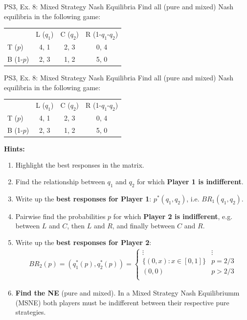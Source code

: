 \begin{frame}{PS3, Ex. 8: Mixed Strategy Nash Equilibria}
  Find all (pure and mixed) Nash equilibria in the following game:
    \begin{table}
      \begin{tabular}{l|c|c|c|}
          \multicolumn{1}{c}{}  & \multicolumn{1}{c}{L ($q_1$)} & \multicolumn{1}{c}{C ($q_2$)} & \multicolumn{1}{c}{R (1-$q_1$-$q_2$)} \\\cline{2-4}
          T ($p$)   & 4, 1 & 2, 3 & 0, 4 \\\cline{2-4}
          B (1-$p$) & 2, 3 & 1, 2 & 5, 0 \\\cline{2-4}
      \end{tabular}
    \end{table}
  \vfill\null
\end{frame}
\begin{frame}{PS3, Ex. 8: Mixed Strategy Nash Equilibria}
  Find all (pure and mixed) Nash equilibria in the following game:
    \begin{table}
      \begin{tabular}{l|c|c|c|}
          \multicolumn{1}{c}{}  & \multicolumn{1}{c}{L ($q_1$)} & \multicolumn{1}{c}{C ($q_2$)} & \multicolumn{1}{c}{R (1-$q_1$-$q_2$)} \\\cline{2-4}
          T ($p$)   & 4, 1 & 2, 3 & 0, 4 \\\cline{2-4}
          B (1-$p$) & 2, 3 & 1, 2 & 5, 0 \\\cline{2-4}
      \end{tabular}
    \end{table}
    \textbf{Hints:}
    \begin{enumerate}
      \item Highlight the best responses in the matrix.
      \item Find the relationship between $q_1$ and $q_2$ for which \textbf{Player 1 is indifferent}.
      \item Write up the \textbf{best responses for Player 1}: $p^{*}(q_1,q_2)$, i.e. $BR_1(q_1,q_2)$.
      \item Pairwise find the probabilities $p$ for which \textbf{Player 2 is indifferent}, e.g. between $L$ and $C$, then $L$ and $R$, and finally between $C$ and $R$.
      \item Write up the \textbf{best responses for Player 2}:
      \begin{align*}
        BR_2(p)=\left(q_1^{*}(p),q_2^{*}(p)\right)=\left\{ \begin{array}{ll}
            \vdots              & \vdots  \\
            \{(0,x):x\in[0,1]\} & p = 2/3 \\
            (0,0)               & p > 2/3 \\
        \end{array}\right.
      \end{align*}
      \item \textbf{Find the NE} (pure and mixed). In a Mixed Strategy Nash Equilibriumm (MSNE) both players must be indifferent between their respective pure strategies.
    \end{enumerate}
  \vfill\null
\end{frame}
